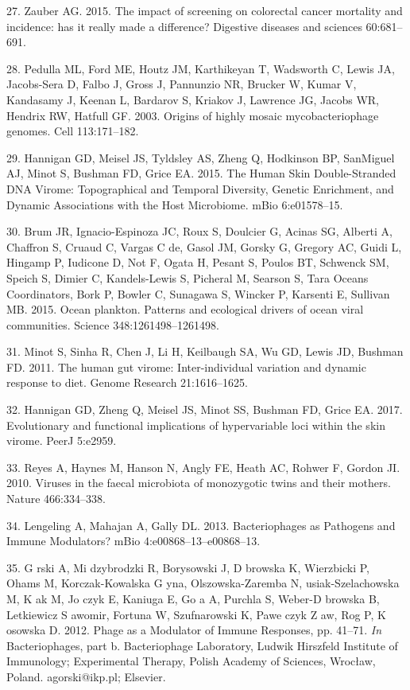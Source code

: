 \documentclass[12pt,]{article}
\begin{document}
\hypertarget{ref-Zauber:2015cr}{}
27. Zauber AG. 2015. The impact of screening on colorectal cancer
mortality and incidence: has it really made a difference? Digestive
diseases and sciences 60:681--691.

\hypertarget{ref-Pedulla:2003tu}{}
28. Pedulla ML, Ford ME, Houtz JM, Karthikeyan T, Wadsworth C, Lewis JA,
Jacobs-Sera D, Falbo J, Gross J, Pannunzio NR, Brucker W, Kumar V,
Kandasamy J, Keenan L, Bardarov S, Kriakov J, Lawrence JG, Jacobs WR,
Hendrix RW, Hatfull GF. 2003. Origins of highly mosaic mycobacteriophage
genomes. Cell 113:171--182.

\hypertarget{ref-Hannigan:2015fz}{}
29. Hannigan GD, Meisel JS, Tyldsley AS, Zheng Q, Hodkinson BP,
SanMiguel AJ, Minot S, Bushman FD, Grice EA. 2015. The Human Skin
Double-Stranded DNA Virome: Topographical and Temporal Diversity,
Genetic Enrichment, and Dynamic Associations with the Host Microbiome.
mBio 6:e01578--15.

\hypertarget{ref-Brum:2015iaa}{}
30. Brum JR, Ignacio-Espinoza JC, Roux S, Doulcier G, Acinas SG, Alberti
A, Chaffron S, Cruaud C, Vargas C de, Gasol JM, Gorsky G, Gregory AC,
Guidi L, Hingamp P, Iudicone D, Not F, Ogata H, Pesant S, Poulos BT,
Schwenck SM, Speich S, Dimier C, Kandels-Lewis S, Picheral M, Searson S,
Tara Oceans Coordinators, Bork P, Bowler C, Sunagawa S, Wincker P,
Karsenti E, Sullivan MB. 2015. Ocean plankton. Patterns and ecological
drivers of ocean viral communities. Science 348:1261498--1261498.

\hypertarget{ref-Minot:2011ez}{}
31. Minot S, Sinha R, Chen J, Li H, Keilbaugh SA, Wu GD, Lewis JD,
Bushman FD. 2011. The human gut virome: Inter-individual variation and
dynamic response to diet. Genome Research 21:1616--1625.

\hypertarget{ref-Hannigan:2017ky}{}
32. Hannigan GD, Zheng Q, Meisel JS, Minot SS, Bushman FD, Grice EA.
2017. Evolutionary and functional implications of hypervariable loci
within the skin virome. PeerJ 5:e2959.

\hypertarget{ref-Reyes:2010cwa}{}
33. Reyes A, Haynes M, Hanson N, Angly FE, Heath AC, Rohwer F, Gordon
JI. 2010. Viruses in the faecal microbiota of monozygotic twins and
their mothers. Nature 466:334--338.

\hypertarget{ref-Lengeling:2013ia}{}
34. Lengeling A, Mahajan A, Gally DL. 2013. Bacteriophages as Pathogens
and Immune Modulators? mBio 4:e00868--13--e00868--13.

\hypertarget{ref-Grski:2012fa}{}
35. G rski A, Mi dzybrodzki R, Borysowski J, D browska K, Wierzbicki P,
Ohams M, Korczak-Kowalska G yna, Olszowska-Zaremba N, usiak-Szelachowska
M, K ak M, Jo czyk E, Kaniuga E, Go a A, Purchla S, Weber-D browska B,
Letkiewicz S awomir, Fortuna W, Szufnarowski K, Pawe czyk Z aw, Rog P, K
osowska D. 2012. Phage as a Modulator of Immune Responses, pp. 41--71.
\emph{In} Bacteriophages, part b. Bacteriophage Laboratory, Ludwik
Hirszfeld Institute of Immunology; Experimental Therapy, Polish Academy
of Sciences, Wrocław, Poland. agorski@ikp.pl; Elsevier.
\end{document}
